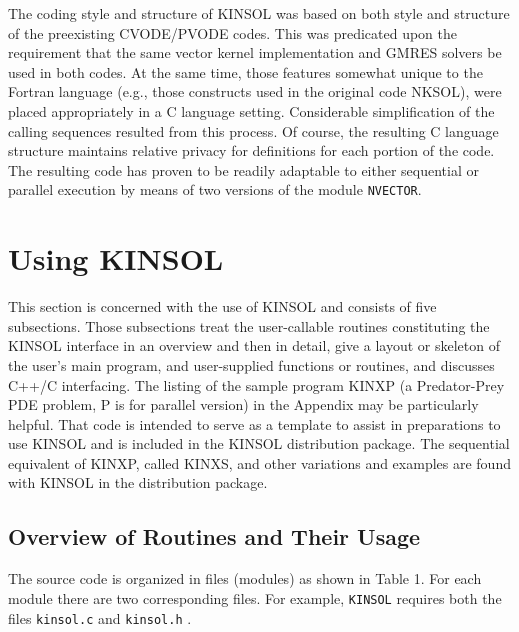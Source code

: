 \documentclass[11pt]{article}
\begin{document}
The coding style and structure of KINSOL was based on both style and structure
of the preexisting CVODE/PVODE codes. This was predicated upon the requirement
that the same vector kernel implementation and GMRES solvers be used in both 
codes. At the same time, those features somewhat unique to the Fortran language
(e.g., those constructs used in the original code NKSOL), were placed 
appropriately in a C language setting. Considerable simplification of the 
calling sequences resulted from this process. Of course, the resulting C 
language structure maintains relative privacy for definitions for each portion
of the code. The resulting code has proven to be readily adaptable to either
sequential or parallel execution by means of two versions of the module 
{\tt NVECTOR}.

\section{Using KINSOL}

This section is concerned with the use of KINSOL and consists of five
subsections. Those subsections treat the user-callable routines constituting 
the KINSOL interface in an overview and then in detail, give a layout or 
skeleton of the user's main program, and user-supplied functions or routines,
and discusses  C++/C interfacing. The listing of the sample program KINXP 
(a Predator-Prey PDE problem, P is for parallel version) in the 
Appendix may be particularly helpful. That code is intended to serve as a 
template to assist in preparations to use KINSOL and is included in the 
KINSOL distribution package. The sequential equivalent of KINXP, called KINXS, and
other variations and examples are found with KINSOL in the distribution
package.


\subsection{Overview of Routines and Their Usage}

The source code is organized in files (modules) as shown in Table 1. For each 
module there are two corresponding files. For example, {\tt KINSOL} requires 
both the files {\tt kinsol.c} and {\tt kinsol.h} .
\end{document}
